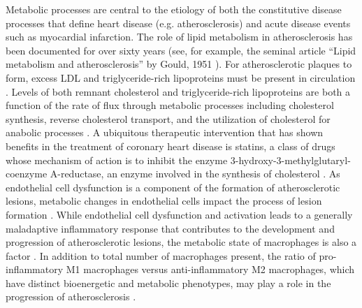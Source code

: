 \begin{DoubleSpace*}
Metabolic processes are central to the etiology of both the constitutive disease processes that define heart disease (e.g. atherosclerosis) and acute disease events such as myocardial infarction. The role of lipid metabolism in atherosclerosis has been documented for over sixty years (see, for example, the seminal article ``Lipid metabolism and atherosclerosis'' by Gould, 1951 \cite{gould1951}). For atherosclerotic plaques to form, excess LDL and triglyceride-rich lipoproteins must be present in circulation \cite{nordestgaard2016}. Levels of both remnant cholesterol and triglyceride-rich lipoproteins are both a function of the rate of flux through metabolic processes including cholesterol synthesis, reverse cholesterol transport, and the utilization of cholesterol for anabolic processes \cite{baynes2014}. A ubiquitous therapeutic intervention that has shown benefits in the treatment of coronary heart disease is statins, a class of drugs whose mechanism of action is to inhibit the enzyme 3-hydroxy-3-methylglutaryl-coenzyme A-reductase, an enzyme involved in the synthesis of cholesterol \cite{chait2016}. As endothelial cell dysfunction is a component of the formation of atherosclerotic lesions, metabolic changes in endothelial cells impact the process of lesion formation \cite{gimbrone2016}. While endothelial cell dysfunction and activation leads to a generally maladaptive inflammatory response that contributes to the development and progression of atherosclerotic lesions, the metabolic state of macrophages is also a factor \cite{bories2017}. In addition to total number of macrophages present, the ratio of pro-inflammatory M1 macrophages versus anti-inflammatory M2 macrophages, which have distinct bioenergetic and metabolic phenotypes, may play a role in the progression of atherosclerosis \cite{bories2017}. 


\end{DoubleSpace*}
